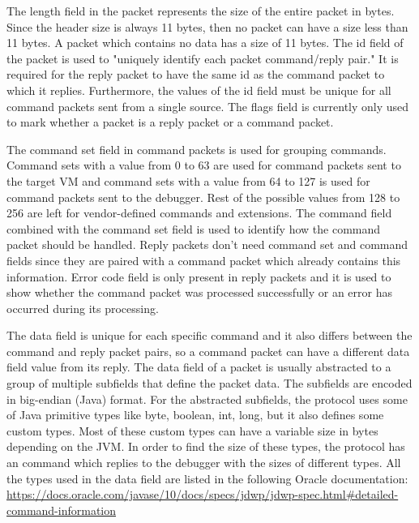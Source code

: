 \documentclass[..thesis.tex]{subfiles}
\begin{document}
The length field in the packet represents the size of the entire packet in bytes. 
Since the header size is always 11 bytes, then no packet can have a size less than 11 bytes.
A packet which contains no data has a size of 11 bytes.
The id field of the packet is used to "uniquely identify each packet command/reply pair."\cite{oracle_jdwp_spec}
It is required for the reply packet to have the same id as the command packet to which it replies.
Furthermore, the values of the id field must be unique for all command packets sent from a single source.
The flags field is currently only used to mark whether a packet is a reply packet or a command packet.

The command set field in command packets is used for grouping commands. 
Command sets with a value from 0 to 63 are used for command packets sent to the target VM and command sets with a value from 64 to 127 is used for command packets sent to the debugger. Rest of the possible values from 128 to 256 are left for vendor-defined commands and extensions.\cite{oracle_jdwp_spec}
The command field combined with the command set field is used to identify how the command packet should be handled. 
Reply packets don't need command set and command fields since they are paired with a command packet which already contains this information.
Error code field is only present in reply packets and it is used to show whether the command packet was processed successfully or an error has occurred during its processing.

The data field is unique for each specific command and it also differs between the command and reply packet pairs, so a command packet can have a different data field value from its reply.
The data field of a packet is usually abstracted to a group of multiple subfields that define the packet data. The subfields are encoded in big-endian (Java) format.
For the abstracted subfields, the protocol uses some of Java primitive types like byte, boolean, int, long, but it also defines some custom types.
Most of these custom types can have a variable size in bytes depending on the JVM.
In order to find the size of these types, the protocol has an  command which replies to the debugger with the sizes of different types.\cite{oracle_jdwp_spec}
All the types used in the data field are listed in the following Oracle documentation: \url{https://docs.oracle.com/javase/10/docs/specs/jdwp/jdwp-spec.html\#detailed-command-information}
\end{document}
